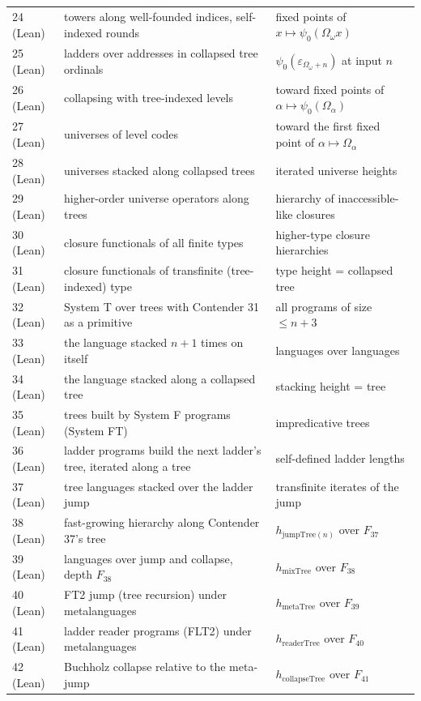 \documentclass[11pt]{article}
\theoremstyle{definition}
\theoremstyle{remark}
\begin{document}
\begin{center}
\begin{tabular}{lll}
24 (Lean) & towers along well-founded indices, self-indexed rounds & fixed points of $x\mapsto\psi_0(\Omega_\omega x)$\\
25 (Lean) & ladders over addresses in collapsed tree ordinals & $\psi_0(\varepsilon_{\Omega_\omega+n})$ at input $n$\\
26 (Lean) & collapsing with tree-indexed levels & toward fixed points of $\alpha\mapsto\psi_0(\Omega_\alpha)$\\
27 (Lean) & universes of level codes & toward the first fixed point of $\alpha\mapsto\Omega_\alpha$\\
28 (Lean) & universes stacked along collapsed trees & iterated universe heights\\
29 (Lean) & higher-order universe operators along trees & hierarchy of inaccessible-like closures\\
30 (Lean) & closure functionals of all finite types & higher-type closure hierarchies\\
31 (Lean) & closure functionals of transfinite (tree-indexed) type & type height = collapsed tree\\
32 (Lean) & System T over trees with Contender 31 as a primitive & all programs of size $\le n{+}3$\\
33 (Lean) & the language stacked $n{+}1$ times on itself & languages over languages\\
34 (Lean) & the language stacked along a collapsed tree & stacking height = tree\\
35 (Lean) & trees built by System F programs (System FT) & impredicative trees\\
36 (Lean) & ladder programs build the next ladder's tree, iterated along a tree & self-defined ladder lengths\\
37 (Lean) & tree languages stacked over the ladder jump & transfinite iterates of the jump\\
38 (Lean) & fast-growing hierarchy along Contender 37's tree & $h_{\mathrm{jumpTree}(n)}$ over $F_{37}$\\
39 (Lean) & languages over jump and collapse, depth $F_{38}$ & $h_{\mathrm{mixTree}}$ over $F_{38}$\\
40 (Lean) & FT2 jump (tree recursion) under metalanguages & $h_{\mathrm{metaTree}}$ over $F_{39}$\\
41 (Lean) & ladder reader programs (FLT2) under metalanguages & $h_{\mathrm{readerTree}}$ over $F_{40}$\\
42 (Lean) & Buchholz collapse relative to the meta-jump & $h_{\mathrm{collapseTree}}$ over $F_{41}$\\

\end{tabular}
\end{center}
\end{document}
